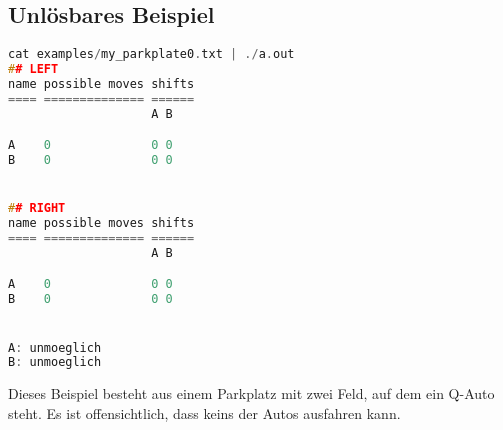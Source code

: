\documentclass[a4paper,10pt,ngerman]{scrartcl}
\begin{document}
\subsection*{Unlösbares Beispiel}
\begin{lstlisting}[language=C++]
cat examples/my_parkplate0.txt | ./a.out
## LEFT
name possible moves shifts
==== ============== ======
                    A B

A    0              0 0
B    0              0 0


## RIGHT
name possible moves shifts
==== ============== ======
                    A B

A    0              0 0
B    0              0 0


A: unmoeglich
B: unmoeglich
\end{lstlisting}
Dieses Beispiel besteht aus einem Parkplatz mit zwei Feld, auf dem ein Q-Auto steht.
Es ist offensichtlich, dass keins der Autos ausfahren kann.
\end{document}
